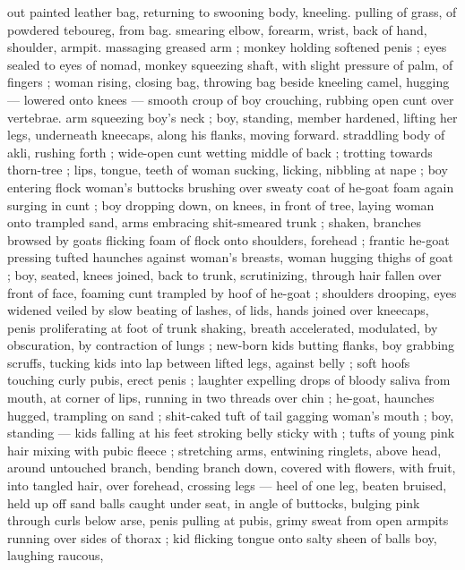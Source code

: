 out painted leather bag, returning to swooning body, kneeling. 
pulling  of grass, of powdered teboureg, from bag. 
smearing elbow, forearm, wrist, back of hand, shoulder, armpit. 
massaging greased arm ; monkey holding softened penis ; eyes 
sealed to eyes of nomad, monkey squeezing shaft, with slight 
pressure of palm, of fingers ; woman rising, closing bag, throwing 
bag beside kneeling camel, hugging --- lowered onto knees --- 
smooth croup of boy crouching, rubbing open cunt over vertebrae. 
arm squeezing boy's neck ; boy, standing, member hardened, lifting 
her legs, underneath kneecaps, along his flanks, moving forward. 
straddling body of akli, rushing forth ; wide-open cunt wetting 
middle of back ; trotting towards thorn-tree ; lips, tongue, teeth of 
woman sucking, licking, nibbling at nape ; boy entering flock {\gl} 
woman's buttocks brushing over sweaty coat of he-goat {\col} foam again 
surging in cunt ; boy dropping down, on knees, in front of tree, 
laying woman onto trampled sand, arms embracing shit-smeared 
trunk ; shaken, branches browsed by goats flicking foam of flock 
onto shoulders, forehead ; frantic he-goat pressing tufted haunches 
against woman's breasts, woman hugging thighs of goat ; boy, 
seated, knees joined, back to trunk, scrutinizing, through hair fallen 
over front of face, foaming cunt trampled by hoof of he-goat ; 
shoulders drooping, eyes widened veiled by slow beating of lashes, 
of lids, hands joined over kneecaps, penis proliferating at foot of 
 trunk shaking, breath accelerated, modulated, by 
obscuration, by contraction of lungs ; new-born kids butting flanks, 
boy grabbing scruffs, tucking kids into lap between lifted legs, 
against belly ; soft hoofs touching curly pubis, erect penis ; laughter 
expelling drops of bloody saliva from mouth, at corner of lips, 
running in two threads over chin ; he-goat, haunches hugged, 
trampling on sand ; shit-caked tuft of tail gagging woman's mouth ; 
boy, standing --- kids falling at his feet {\dashcom} stroking belly sticky with 
 ; tufts of young pink hair mixing with pubic fleece ; 
stretching arms, entwining ringlets, above head, around untouched 
branch, bending branch down, covered with flowers, with fruit, into 
tangled hair, over forehead, crossing legs --- heel of one leg, beaten 
bruised, held up off sand {\dashcom} balls caught under seat, in angle of 
buttocks, bulging pink through curls below arse, penis pulling at 
pubis, grimy sweat from open armpits running over sides of thorax ;
kid flicking tongue onto salty sheen of balls {\col} boy, laughing raucous, 
